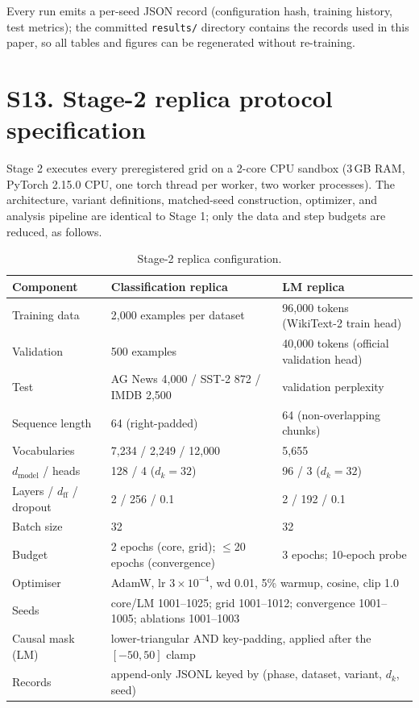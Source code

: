 \documentclass[10pt,a4paper]{article}
\newcommand{\dk}{d_k}
\begin{document}
Every run emits a per-seed JSON record (configuration hash, training history,
test metrics); the committed \texttt{results/} directory contains the records
used in this paper, so all tables and figures can be regenerated without
re-training.


\section*{S13. Stage-2 replica protocol specification}\label{sup:replica}

Stage 2 executes every preregistered grid on a 2-core CPU sandbox
(3\,GB RAM, PyTorch 2.15.0 CPU, one torch thread per worker, two worker
processes). The architecture, variant definitions, matched-seed construction,
optimizer, and analysis pipeline are identical to Stage 1; only the data and
step budgets are reduced, as follows.

\begin{table}[H]
  \centering
  \caption{Stage-2 replica configuration.}
  \small
  \begin{tabular*}{\textwidth}{@{\extracolsep{\fill}} l l l}
    \toprule
    \textbf{Component} & \textbf{Classification replica} & \textbf{LM replica} \\
    \midrule
    Training data & 2{,}000 examples per dataset & 96{,}000 tokens (WikiText-2 train head) \\
    Validation & 500 examples & 40{,}000 tokens (official validation head) \\
    Test & AG News 4{,}000 / SST-2 872 / IMDB 2{,}500 & validation perplexity \\
    Sequence length & 64 (right-padded) & 64 (non-overlapping chunks) \\
    Vocabularies & 7{,}234 / 2{,}249 / 12{,}000 & 5{,}655 \\
    $d_{\text{model}}$ / heads & 128 / 4 ($\dk = 32$) & 96 / 3 ($\dk = 32$) \\
    Layers / $d_{\text{ff}}$ / dropout & 2 / 256 / 0.1 & 2 / 192 / 0.1 \\
    Batch size & 32 & 32 \\
    Budget & 2 epochs (core, grid); $\le$20 epochs (convergence) & 3 epochs; 10-epoch probe \\
    Optimiser & \multicolumn{2}{l}{AdamW, lr $3\times10^{-4}$, wd 0.01, 5\% warmup, cosine, clip 1.0} \\
    Seeds & \multicolumn{2}{l}{core/LM 1001--1025; grid 1001--1012; convergence 1001--1005; ablations 1001--1003} \\
    Causal mask (LM) & \multicolumn{2}{l}{lower-triangular AND key-padding, applied after the $[-50,50]$ clamp} \\
    Records & \multicolumn{2}{l}{append-only JSONL keyed by (phase, dataset, variant, $\dk$, seed)} \\
    \bottomrule
  \end{tabular*}
\end{table}
\end{document}
